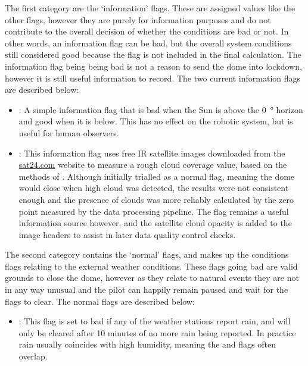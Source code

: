 \begin{colsection}
\begin{colsection}
\clearpage

The first category are the `information' flags. These are assigned values like the other flags, however they are purely for information purposes and do not contribute to the overall decision of whether the conditions are bad or not. In other words, an information flag can be bad, but the overall system conditions still considered good because the flag is not included in the final calculation. The information flag being being bad is not a reason to send the dome into lockdown, however it is still useful information to record. The two current information flags are described below:

\begin{itemize}
    \item {}: A simple information flag that is bad when the Sun is above the \SI{0}{\degree} horizon and good when it is below. This has no effect on the robotic system, but is useful for human observers.

    \item {}: This information flag uses free IR satellite images downloaded from the \url{sat24.com} website to measure a rough cloud coverage value, based on the methods of \citet{clouds}. Although initially trialled as a normal flag, meaning the dome would close when high cloud was detected, the results were not consistent enough and the presence of clouds was more reliably calculated by the zero point measured by the data processing pipeline. The flag remains a useful information source however, and the satellite cloud opacity is added to the image headers to assist in later data quality control checks.
\end{itemize}

The second category contains the `normal' flags, and makes up the conditions flags relating to the external weather conditions. These flags going bad are valid grounds to close the dome, however as they relate to natural events they are not in any way unusual and the pilot can happily remain paused and wait for the flags to clear. The normal flags are described below:

\begin{itemize}
    \item {}: This flag is set to bad if any of the weather stations report rain, and will only be cleared after 10 minutes of no more rain being reported. In practice rain usually coincides with high humidity, meaning the  and  flags often overlap.


\end{itemize}
\end{colsection}
\end{colsection}
